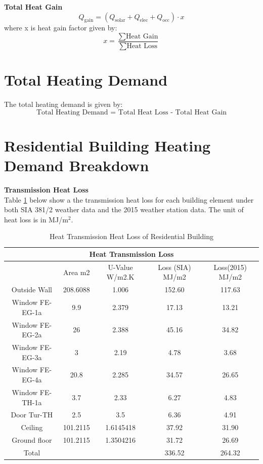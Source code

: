 \documentclass[a4paper, oneside]{discothesis}
\begin{document}
	\textbf{Total Heat Gain}\\
	\[Q_{\text{gain}} = (Q_{\text{solar}} + Q_{\text{elec}} + Q_{\text{occ}}) \cdot x\]
	where x is heat gain factor given by:
	\[ x = \frac{\sum \text{Heat Gain}}{\sum \text{Heat Loss}}\]

	\section{Total Heating Demand}
	The total heating demand is given by:
	\[\text{Total Heating Demand = Total Heat Loss - Total Heat Gain}\]

	\newpage 
	\section{Residential Building Heating Demand Breakdown}		
		\textbf{Transmission Heat Loss}\\
		Table \ref{tab:HonggTransmission} below show a the transmission heat loss for each building element under both SIA 381/2 weather data and the 2015 weather station data. The unit of heat loss is in MJ/m$^2$.
		\begin{table}[htbp]
		\small
		\centering
		\caption{Heat Transmission Heat Loss of Residential Building}
		    \begin{tabular}{|ccccc|}
		    \toprule
		    \multicolumn{5}{|c|}{\textbf{Heat Transmission Loss}} \\
		    \midrule
		          & \multicolumn{1}{p{4.785em}}{Area m2} & \multicolumn{1}{p{4.785em}}{U-Value W/m2.K} & \multicolumn{1}{p{5.715em}}{Loss (SIA) MJ/m2} & \multicolumn{1}{p{5.715em}|}{Loss(2015) MJ/m2} \\
		    \midrule
		    Outside Wall & 208.6088 & 1.006 & 152.60 & 117.63 \\
		    Window FE-EG-1a & 9.9   & 2.379 & 17.13 & 13.21 \\
		    Window FE-EG-2a & 26    & 2.388 & 45.16 & 34.82 \\
		    Window FE-EG-3a & 3     & 2.19  & 4.78  & 3.68 \\
		    Window FE-EG-4a & 20.8  & 2.285 & 34.57 & 26.65 \\
		    Window FE-TH-1a & 3.7   & 2.33  & 6.27  & 4.83 \\
		    Door Tur-TH & 2.5   & 3.5   & 6.36  & 4.91 \\
		    Ceiling & 101.2115 & 1.6145418 & 37.92 & 31.90 \\
		    Ground floor & 101.2115 & 1.3504216 & 31.72 & 26.69 \\
		    \midrule
		    Total &       &       & 336.52 & 264.32 \\
		    \bottomrule
		    \end{tabular}%
		  \label{tab:HonggTransmission}%
		\end{table}%
\end{document}
